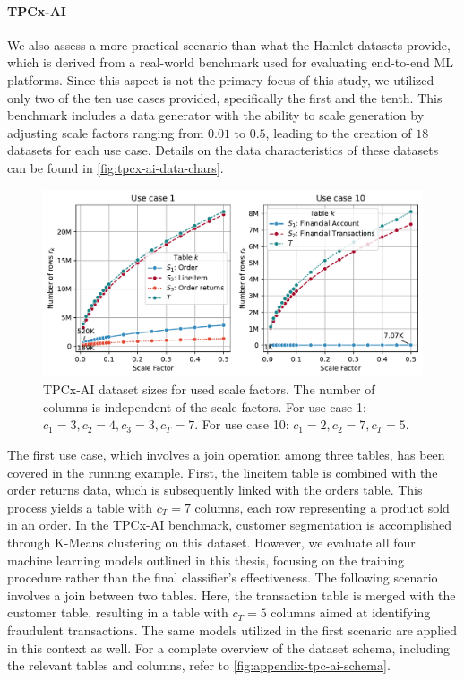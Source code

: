 \paragraph{TPCx-AI~\cite{tpcx-ai}} We also assess a more practical scenario than what the Hamlet datasets provide, which is derived from a real-world benchmark used for evaluating end-to-end ML platforms. Since this aspect is not the primary focus of this study, we utilized only two of the ten use cases provided, specifically the first and the tenth. This benchmark includes a data generator with the ability to scale generation by adjusting scale factors ranging from $0.01$ to $0.5$, leading to the creation of $18$ datasets for each use case. Details on the data characteristics of these datasets can be found in \autoref{fig:tpcx-ai-data-chars}.

\begin{figure}
  \centering
  \includegraphics[width=\linewidth]{chapters/06_evaluation/figures/tpcx-ai-data-chars.pdf}
  \caption[TPCx-AI dataset sizes for used scale factors.]{TPCx-AI dataset sizes for used scale factors. The number of columns is independent of the scale factors. For use case 1: $c_1=3, c_2=4, c_3=3, c_T=7$. For use case 10: $c_1=2, c_2=7, c_T=5$.}
  \label{fig:tpcx-ai-data-chars}
\end{figure}


The first use case, which involves a join operation among three tables, has been covered in the running example. First, the lineitem table is combined with the order returns data, which is subsequently linked with the orders table. This process yields a table with $c_T=7$ columns, each row representing a product sold in an order. In the TPCx-AI benchmark, customer segmentation is accomplished through K-Means clustering on this dataset. However, we evaluate all four machine learning models outlined in this thesis, focusing on the training procedure rather than the final classifier's effectiveness. The following scenario involves a join between two tables. Here, the transaction table is merged with the customer table, resulting in a table with $c_T=5$ columns aimed at identifying fraudulent transactions. The same models utilized in the first scenario are applied in this context as well. For a complete overview of the dataset schema, including the relevant tables and columns,  refer to \autoref{fig:appendix-tpc-ai-schema}.

